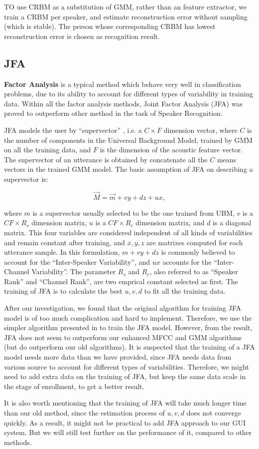 TO use CRBM as a substitution of GMM, rather than
an feature extractor, we train a CRBM per speaker,
and estimate reconstruction error without sampling (which is stable).
The person whose corresponding CRBM has lowest reconstruction error is chosen as
recognition result.

\subsection{JFA}

\textbf{Factor Analysis} is a typical method which behave
very well in classification problems, due to its ability to
account for different types of variability in training data.
Within all the factor analysis methods,
Joint Factor Analysis (JFA)\cite{jfa2,jfa-se} was proved to outperform other method
in the task of Speaker Recognition.

JFA models the user by ``supervector'' , i.e. a $C\times F $ dimension vector, where $C$ is
the number of components in the Universal Background Model, trained by GMM on all the training data,
and $ F$ is the dimension of the acoustic feature vector. The supervector of an utterance is obtained by concatenate
all the $C $ means vectors in the trained GMM model. The basic assumption of JFA on describing a supervector is:

\[ \vec{M} = \vec{ m } + vy + dz + ux, \]

where $m$ is a supervector usually selected to be the one trained from UBM, $v$ is a $ CF \times R_s$ dimension matrix,
$ u$ is a $ CF \times R_c$ dimension matrix, and $d$ is a diagonal matrix.
This four variables are considered independent of all kinds of variabilities and remain constant after training, and
$x, y, z $ are matrixes computed for each utterance sample.
In this formulation, $ m + vy + dz$ is commonly believed to account for the ``Inter-Speaker Variability'', and $ux $ accounts
for the ``Inter-Channel Variability''.
The parameter $ R_s $ and $ R_c$, also referred to as ``Speaker Rank'' and ``Channel Rank'', are two emprical constant selected as first.
The training of JFA is to calculate the best $ u, v, d$ to fit all the training data.

After our investigation, we found that the original algorithm \cite{jfa-se} for training JFA model is of
too much complication and hard to implement.
Therefore, we use the simpler algorithm presented in \cite{jfa-study}
to train the JFA model. However, from the result, JFA does not seem to outperform our enhanced MFCC and GMM algorithms
(but do outperform our old algorithms). It is suspected that the training of a JFA model needs more data than
we have provided, since JFA needs data from various source to account for different types of variabilities.
Therefore, we might need to add extra data on the training of JFA, but keep the same data scale in the stage of enrollment,
to get a better result.

It is also worth mentioning that the training of JFA will take much longer time than our old method,
since the estimation process of $ u, v, d$ does not converge quickly. As a result, it might not be practical to add
JFA approach to our GUI system. But we will still test further on the performance of it, compared to other methods.
